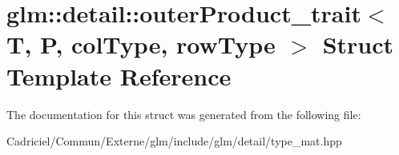 \hypertarget{structglm_1_1detail_1_1outer_product__trait}{}\section{glm\+:\+:detail\+:\+:outer\+Product\+\_\+trait$<$ T, P, col\+Type, row\+Type $>$ Struct Template Reference}
\label{structglm_1_1detail_1_1outer_product__trait}


The documentation for this struct was generated from the following file\+:\begin{DoxyCompactItemize}
\item 
Cadriciel/\+Commun/\+Externe/glm/include/glm/detail/type\+\_\+mat.\+hpp\end{DoxyCompactItemize}
